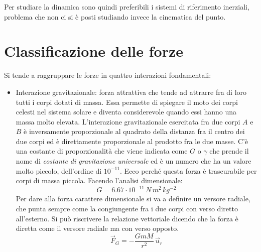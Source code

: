 Per studiare la dinamica sono quindi preferibili i sistemi di riferimento inerziali, problema che non ci si è posti studiando invece la cinematica del punto.

\section{Classificazione delle forze}

Si tende a raggruppare le forze in quattro interazioni fondamentali:

\begin{itemize}
	\item Interazione gravitazionale: forza attrattiva che tende ad attrarre fra di loro tutti i corpi dotati di massa. Essa permette di spiegare il moto dei corpi celesti nel sistema solare e diventa considerevole quando essi hanno una massa molto elevata. L'interazione gravitazionale esercitata fra due corpi $A$ e $B$ è inversamente proporzionale al quadrato della distanza fra il centro dei due corpi ed è direttamente proporzionale al prodotto fra le due masse. C'è una costante di proporzionalità che viene indicata come $G$ o $\gamma$ che prende il nome di \emph{costante di gravitazione universale} ed è un numero che ha un valore molto piccolo, dell'ordine di $10^{-11}$. Ecco perché questa forza è trascurabile per corpi di massa piccola.
	Facendo l'analisi dimensionale:
	\[
		G=6.67\cdot 10^{-11} \, N\,m^2\,kg^{-2}
	\]
	Per dare alla forza carattere dimensionale si va a definire un versore radiale, che punta sempre come la congiungente fra i due corpi con verso diretto all'esterno. Si può riscrivere la relazione vettoriale dicendo che la forza è diretta come il versore radiale ma con verso opposto.
	\begin{equation}
		\vec{F}_G=-\frac{GmM}{r^2}\,\vec{u}_r
	\end{equation}
	\begin{figure}[htpb]
		\centering
		

		\begin{tikzpicture}[x=0.75pt,y=0.75pt,yscale=-1,xscale=1]


\end{tikzpicture}
\end{figure}
\end{itemize}
